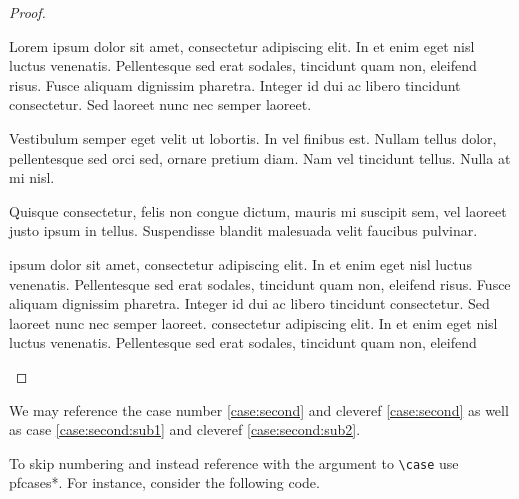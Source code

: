 \documentclass[leqno,11pt]{amsart}
\begin{document}
\begin{proof}
\begin{pfcases}
\case[\( x = y \)]\label{case:first} %
	Lorem ipsum dolor sit amet, consectetur adipiscing elit. In et enim eget nisl luctus venenatis. Pellentesque sed erat sodales, tincidunt quam non, eleifend risus. Fusce aliquam dignissim pharetra. Integer id dui ac libero tincidunt consectetur. Sed laoreet nunc nec semper laoreet. 

	Vestibulum semper eget velit ut lobortis. In vel finibus est. Nullam tellus dolor, pellentesque sed orci sed, ornare pretium diam. Nam vel tincidunt tellus. Nulla at mi nisl. 

\case[\( x = z \land z > q \land z < r \land x + z = r \)] \label{case:second} %
	Quisque consectetur, felis non congue dictum, mauris mi suscipit sem, vel laoreet justo ipsum in tellus. Suspendisse blandit malesuada velit faucibus pulvinar. 

\begin{pfcases}
\case[\( x=2 \)] \label{case:second:sub1} %
	ipsum dolor sit amet, consectetur adipiscing elit. In et enim eget nisl luctus venenatis. Pellentesque sed erat sodales, tincidunt quam non, eleifend risus. Fusce aliquam dignissim pharetra. Integer id dui ac libero tincidunt consectetur. Sed laoreet nunc nec semper laoreet. 
\case[\( x = 3 \)] \label{case:second:sub2} %
	consectetur adipiscing elit. In et enim eget nisl luctus venenatis. Pellentesque sed erat sodales, tincidunt quam non, eleifend 
\end{pfcases}

\end{pfcases}
\end{proof}
We may reference the case number \ref{case:second} and cleveref \cref{case:second} as well as case \ref{case:second:sub1} and cleveref \cref{case:second:sub2}.



To skip numbering and instead reference with the argument to \verb=\case= use pfcases*.  For instance, consider the following code.
\end{document}
